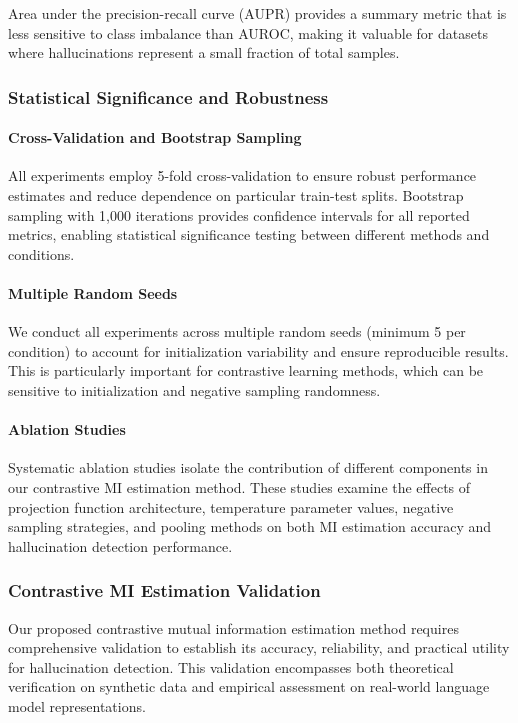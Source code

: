 Area under the precision-recall curve (AUPR) provides a summary metric that is less sensitive to class imbalance than AUROC, making it valuable for datasets where hallucinations represent a small fraction of total samples.

\subsubsection{Statistical Significance and Robustness}

\paragraph{Cross-Validation and Bootstrap Sampling}
All experiments employ 5-fold cross-validation to ensure robust performance estimates and reduce dependence on particular train-test splits. Bootstrap sampling with 1,000 iterations provides confidence intervals for all reported metrics, enabling statistical significance testing between different methods and conditions.

\paragraph{Multiple Random Seeds}
We conduct all experiments across multiple random seeds (minimum 5 per condition) to account for initialization variability and ensure reproducible results. This is particularly important for contrastive learning methods, which can be sensitive to initialization and negative sampling randomness.

\paragraph{Ablation Studies}
Systematic ablation studies isolate the contribution of different components in our contrastive MI estimation method. These studies examine the effects of projection function architecture, temperature parameter values, negative sampling strategies, and pooling methods on both MI estimation accuracy and hallucination detection performance.

\subsubsection{Contrastive MI Estimation Validation}

Our proposed contrastive mutual information estimation method requires comprehensive validation to establish its accuracy, reliability, and practical utility for hallucination detection. This validation encompasses both theoretical verification on synthetic data and empirical assessment on real-world language model representations.

